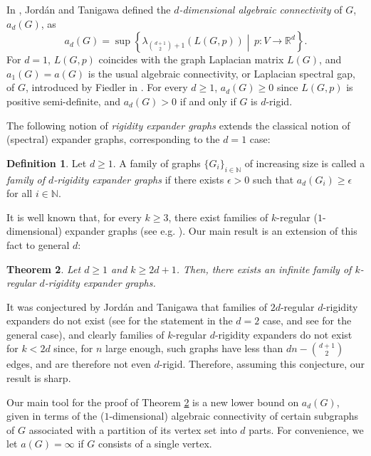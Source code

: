 \documentclass[a4paper,11pt]{article}
\theoremstyle{plain}
\newtheorem{theorem}{\bf Theorem}[section]
\theoremstyle{definition}
\newtheorem{definition}[theorem]{\bf Definition}
\newcommand{\Rea}{{\mathbb R}}
\begin{document}
In \cite{jordan2022rigidity}, Jord\'an and Tanigawa defined the \emph{$d$-dimensional algebraic connectivity} of $G$, $a_d(G)$, as
\[
a_d(G)=\sup\left\{ \lambda_{\binom{d+1}{2}+1}(L(G,p)) \middle| \, p: V\to \Rea^d\right\}.
\]
For $d=1$, $L(G,p)$ coincides with the graph Laplacian matrix $L(G)$, and $a_1(G)=a(G)$ is the usual algebraic connectivity, or Laplacian spectral gap, of $G$, introduced by Fiedler in \cite{fiedler1973algebraic}. For every $d\ge 1$, $a_d(G) \ge 0$ since $L(G,p)$ is positive semi-definite, and $a_d(G)>0$ if and only if $G$ is $d$-rigid.

The following notion of \emph{rigidity expander graphs} extends the classical notion of (spectral) expander graphs, corresponding to the $d=1$ case:

\begin{definition}\label{def:expander}
Let $d\geq 1$. A family of graphs $\{G_i\}_{i\in\mathbb{N}}$ of increasing size is called a \emph{family of $d$-rigidity expander graphs} if there exists $\epsilon>0$ such that $a_d(G_i)\geq \epsilon$ for all $i\in\mathbb{N}$.
\end{definition}

It is well known that, for every $k\geq 3$, there exist families of $k$-regular ($1$-dimensional) expander graphs (see e.g. \cite{hoory2006expander}).
Our main result is an extension of this fact to general $d$:

\begin{theorem}\label{thm:rigidity_expanders}
Let $d\geq 1$ and $k\ge 2d+1$. Then, there exists an infinite family of $k$-regular $d$-rigidity expander graphs.
\end{theorem}

It was conjectured by Jord\'an and Tanigawa that families of $2d$-regular $d$-rigidity expanders do not exist
(see \cite[Conj. 2]{jordan2022rigidity} for the statement in the $d=2$ case, and see \cite[Conj. 6.2]{lew2022d} for the general case), and clearly families of $k$-regular $d$-rigidity expanders do not exist for $k<2d$ since, for $n$ large enough, such graphs have less than $dn-\binom{d+1}{2}$ edges, and are therefore not even $d$-rigid. Therefore, assuming this conjecture, our result is sharp.


Our main tool for the proof of Theorem \ref{thm:rigidity_expanders} is a new lower bound on $a_d(G)$, given in terms of the ($1$-dimensional) algebraic connectivity of certain subgraphs of $G$ associated with a partition of its vertex set into $d$ parts. For convenience, we let $a(G)=\infty$ if $G$ consists of a single vertex.
\end{document}
